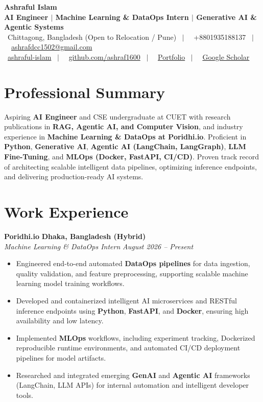 \documentclass[a4paper,10pt]{article}
\newcommand{\experienceEntry}[5]{
  \vspace{3pt}
  \noindent\textbf{\large #1} \hfill \textbf{\small #2} \\
  \noindent\textit{\small #3} \hfill \textit{\small #4}
  \begin{itemize}[leftmargin=12pt, topsep=1pt, itemsep=1.5pt]
    #5
  \end{itemize}
}
\begin{document}
\begin{center}
    {\Huge \textbf{Ashraful Islam}} \\[4pt]
    \small \textbf{\color{charcoal}AI Engineer $|$ Machine Learning \& DataOps Intern $|$ Generative AI \& Agentic Systems} \\[3pt]
    \small
    \faMapMarker*~Chittagong, Bangladesh (Open to Relocation / Pune) \ $|$ \ 
    \faPhone*~+8801935188137 \ $|$ \ 
    \faEnvelope~\href{mailto:ashrafdcc1502@gmail.com}{ashrafdcc1502@gmail.com} \\[2pt]
    \faLinkedin~\href{https://www.linkedin.com/in/ashraful-islam-a31268226/}{ashraful-islam} \ $|$ \ 
    \faGithub~\href{https://github.com/ashraf1600}{github.com/ashraf1600} \ $|$ \ 
    \faGlobe~\href{https://ashraf1600.github.io}{Portfolio} \ $|$ \ 
    \faGraduationCap~\href{https://scholar.google.com/citations?user=ashraf1600}{Google Scholar}
\end{center}

\vspace{-6pt}

\section{Professional Summary}
\small{
Aspiring \textbf{AI Engineer} and CSE undergraduate at CUET with research publications in \textbf{RAG, Agentic AI, and Computer Vision}, and industry experience in \textbf{Machine Learning \& DataOps at Poridhi.io}. Proficient in \textbf{Python}, \textbf{Generative AI}, \textbf{Agentic AI (LangChain, LangGraph)}, \textbf{LLM Fine-Tuning}, and \textbf{MLOps (Docker, FastAPI, CI/CD)}. Proven track record of architecting scalable intelligent data pipelines, optimizing inference endpoints, and delivering production-ready AI systems.
}

\section{Work Experience}
\experienceEntry
  {Poridhi.io}{Dhaka, Bangladesh (Hybrid)}
  {Machine Learning \& DataOps Intern}{August 2026 -- Present}
  {
    \item Engineered end-to-end automated \textbf{DataOps pipelines} for data ingestion, quality validation, and feature preprocessing, supporting scalable machine learning model training workflows.
    \item Developed and containerized intelligent AI microservices and RESTful inference endpoints using \textbf{Python}, \textbf{FastAPI}, and \textbf{Docker}, ensuring high availability and low latency.
    \item Implemented \textbf{MLOps} workflows, including experiment tracking, Dockerized reproducible runtime environments, and automated CI/CD deployment pipelines for model artifacts.
    \item Researched and integrated emerging \textbf{GenAI} and \textbf{Agentic AI} frameworks (LangChain, LLM APIs) for internal automation and intelligent developer tools.
  }
\end{document}
